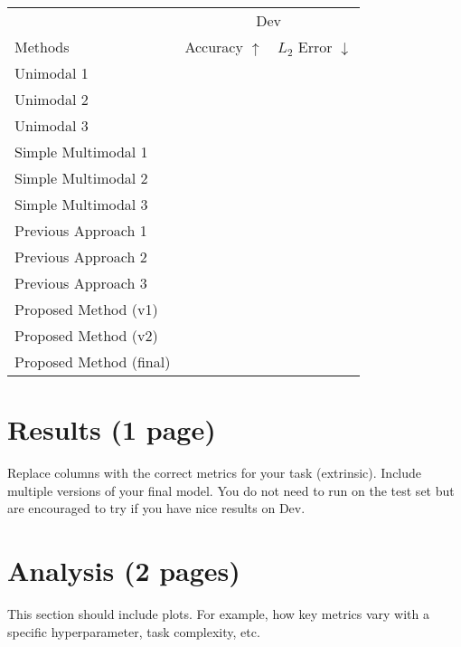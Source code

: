 \documentclass[11pt,a4paper]{article}
\begin{document}
\clearpage
\begin{table}[t]
\centering
\begin{tabular}{@{}lrr@{}}
\toprule
                            & \multicolumn{2}{c}{Dev} \\
Methods                     & Accuracy $\uparrow$ & $L_2$ Error $\downarrow$  \\
\midrule
Unimodal 1 \cite{} & & \\
Unimodal 2 \cite{} & & \\
Unimodal 3 \cite{} & & \\
\midrule
Simple Multimodal 1 \cite{} & & \\
Simple Multimodal 2 \cite{} & & \\
Simple Multimodal 3 \cite{} & & \\
\midrule
Previous Approach 1 \cite{} & & \\
Previous Approach 2 \cite{} & & \\
Previous Approach 3 \cite{} & & \\
\midrule
Proposed Method (v1)            & & \\
Proposed Method (v2)            & & \\
Proposed Method (final)            & & \\
\bottomrule
\end{tabular}
\end{table}
\section{Results (1 page)}
Replace columns with the correct metrics for your task (extrinsic). Include multiple versions of your final model.  You do not need to run on the test set but are encouraged to try if you have nice results on Dev.

\clearpage
\section{Analysis (2 pages)}
This section should include plots.  For example, how key metrics vary with a specific hyperparameter, task complexity, etc.
\end{document}
